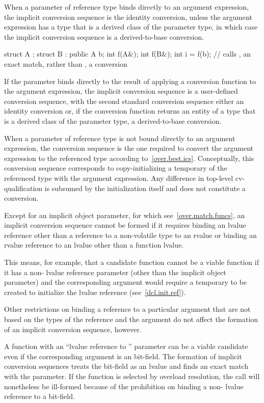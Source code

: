\pnum
When a parameter of reference type binds directly to an
argument expression, the implicit conversion sequence is the identity conversion,
unless the argument expression has a type that is a derived class of the parameter
type, in which case the implicit conversion sequence is a derived-to-base
conversion.
\begin{example}
\begin{codeblock}
struct A {};
struct B : public A {} b;
int f(A&);
int f(B&);
int i = f(b);       // calls , an exact match, rather than , a conversion
\end{codeblock}
\end{example}
If the parameter binds directly to the result of
applying a conversion function to the argument expression, the implicit
conversion sequence is a user-defined conversion sequence,
with the second standard conversion sequence either an identity conversion or,
if the conversion function returns an entity of a type that is a derived class
of the parameter type, a derived-to-base conversion.

\pnum
When a parameter of reference type is not bound directly to an argument
expression, the conversion sequence is the one required to convert the argument
expression to the referenced type according to~\ref{over.best.ics}.
Conceptually, this conversion sequence corresponds to copy-initializing a
temporary of the referenced type with the argument expression.
Any difference
in top-level cv-qualification is subsumed by the initialization itself and
does not constitute a conversion.

\pnum
Except for an implicit object parameter, for which see~\ref{over.match.funcs},
an implicit conversion sequence cannot be formed if it requires
binding an lvalue reference
other than a reference to a non-volatile  type
to an rvalue
or binding an rvalue reference to an lvalue other than a function lvalue.
\begin{note}
This means, for example, that a candidate function cannot be a viable
function if it has a non- lvalue reference parameter (other than
the implicit object parameter) and the corresponding argument
would require a temporary to be created to initialize the lvalue
reference (see~\ref{dcl.init.ref}).
\end{note}

\pnum
Other restrictions on binding a reference to a particular argument
that are not based on the types of the reference and the argument
do not affect the formation of an implicit conversion
sequence, however.
\begin{example}
A function with an ``lvalue reference to '' parameter can
be a viable candidate even if the corresponding argument is an
bit-field.
The formation of implicit conversion sequences
treats the
bit-field as an
lvalue and finds an exact
match with the parameter.
If the function is selected by overload
resolution, the call will nonetheless be ill-formed because of
the prohibition on binding a non- lvalue reference to a bit-field.
\end{example}

